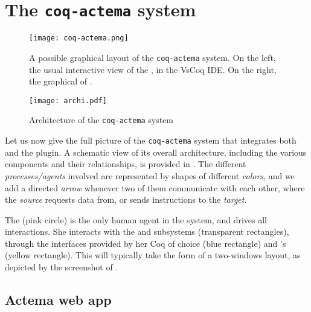 \section{The \texttt{coq-actema} system}
\begin{figure*}
  \texttt{[image: coq-actema.png]}
  \caption{ A possible graphical layout of the \texttt{coq-actema} system. On
    the left, the usual interactive view of the , in the VsCoq IDE.
    On the right, the graphical  of .}
\end{figure*}

\begin{figure*}
  \texttt{[image: archi.pdf]}
  \caption{Architecture of the \texttt{coq-actema} system}
\end{figure*}


Let us now give the full picture of the \texttt{coq-actema} system that
integrates both  and the  plugin. A schematic view of its overall
architecture, including the various components and their relationships, is
provided in . The different \emph{processes/agents} involved are
represented by shapes of different \emph{colors}, and we add a directed
\emph{arrow} whenever two of them communicate with each other, where the
\emph{source} requests data from, or sends instructions to the \emph{target}.

The  (pink circle) is the only human agent in the system, and
drives all interactions. She interacts with the  and  subsystems
(transparent rectangles), through the interfaces provided by her Coq
 of choice (blue rectangle) and 's  (yellow
rectangle). This will typically take the form of a two-windows layout, as
depicted by the screenshot of .

\subsection{Actema web app}

